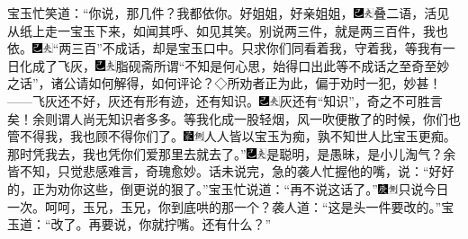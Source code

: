 宝玉忙笑道：``你说，那几件？我都依你。好姐姐，好亲姐姐，{\includegraphics[width=3mm]{../Images/00003}\includegraphics[width=3mm]{../Images/00012}\footnotesize \kaishu 叠二语，活见从纸上走一宝玉下来，如闻其呼、如见其笑。}别说两三件，就是两三百件，我也依。{\includegraphics[width=3mm]{../Images/00003}\includegraphics[width=3mm]{../Images/00012}\footnotesize \kaishu ``两三百''不成话，却是宝玉口中。}只求你们同看着我，守着我，等我有一日化成了飞灰，{\includegraphics[width=3mm]{../Images/00003}\includegraphics[width=3mm]{../Images/00012}\footnotesize \kaishu 脂砚斋所谓``不知是何心思，始得口出此等不成话之至奇至妙之话''，诸公请如何解得，如何评论？◇所劝者正为此，偏于劝时一犯，妙甚！}------飞灰还不好，灰还有形有迹，还有知识。{\includegraphics[width=3mm]{../Images/00003}\includegraphics[width=3mm]{../Images/00012}\footnotesize \kaishu 灰还有``知识''，奇之不可胜言矣！余则谓人尚无知识者多多。}等我化成一股轻烟，风一吹便散了的时候，你们也管不得我，我也顾不得你们了。{\includegraphics[width=3mm]{../Images/00006}\includegraphics[width=3mm]{../Images/00011}\footnotesize \kaishu 人人皆以宝玉为痴，孰不知世人比宝玉更痴。}那时凭我去，我也凭你们爱那里去就去了。''{\includegraphics[width=3mm]{../Images/00003}\includegraphics[width=3mm]{../Images/00012}\footnotesize \kaishu 是聪明，是愚昧，是小儿淘气？余皆不知，只觉悲感难言，奇瑰愈妙。}话未说完，急的袭人忙握他的嘴，说：``好好的，正为劝你这些，倒更说的狠了。''宝玉忙说道：``再不说这话了。''{\includegraphics[width=3mm]{../Images/00004}\includegraphics[width=3mm]{../Images/00011}\footnotesize \kaishu 只说今日一次。呵呵，玉兄，玉兄，你到底哄的那一个？}袭人道：``这是头一件要改的。''宝玉道：``改了。再要说，你就拧嘴。还有什么？''

